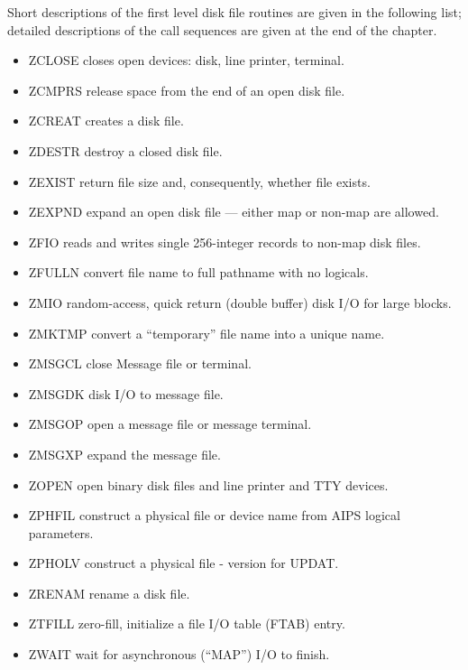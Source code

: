 Short descriptions of the first level disk file routines are given in the
following list; detailed descriptions of the call sequences are given
at the end of the chapter.
\begin{itemize} %
\item ZCLOSE  closes open devices: disk, line printer,
terminal.
\item ZCMPRS  release space from the end of an open disk
file.
\item ZCREAT  creates a disk file.
\item ZDESTR  destroy a closed disk file.
\item ZEXIST  return file size and, consequently,
whether file exists.
\item ZEXPND  expand an open disk file --- either map or
non-map are allowed.
\item ZFIO    reads and writes single 256-integer records
to non-map disk files.
\item ZFULLN  convert file name to full pathname with no
logicals.
\item ZMIO    random-access, quick return (double buffer)
disk I/O for large blocks.
\item ZMKTMP  convert a ``temporary'' file name into a
unique name.
\item ZMSGCL  close Message file or terminal.
\item ZMSGDK  disk I/O to message file.
\item ZMSGOP  open a message file or message terminal.
\item ZMSGXP  expand the message file.
\item ZOPEN   open binary disk files and line printer and
TTY devices.
\item ZPHFIL  construct a physical file or device name
from AIPS logical parameters.
\item ZPHOLV  construct a physical file - version for
UPDAT.
\item ZRENAM  rename a disk file.
\item ZTFILL  zero-fill, initialize a file I/O table
(FTAB) entry.
\item ZWAIT   wait for asynchronous (``MAP'') I/O to finish.

\end{itemize} %

